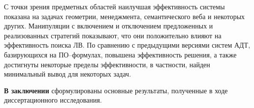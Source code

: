 \documentclass[a4paper]{report}
\begin{document}
С точки зрения предметных областей наилучшая эффективность системы показана на задачах геометрии, менеджмента, семантического веба и некоторых других. Манипуляции с включением и отключением предложенных и реализованных стратегий показывают, что они положительно влияют на эффективность поиска ЛВ. По сравнению с предыдущими версиями систем АДТ, базирующихся на ПО--формулах, повышена эффективность решения, а также достигнуты некоторые пределы эффективности, в частности, найден минимальный вывод для некоторых задач.



\textbf{В заключении} сформулированы основные результаты, полученные в ходе диссертационного исследования.

\end{document}
